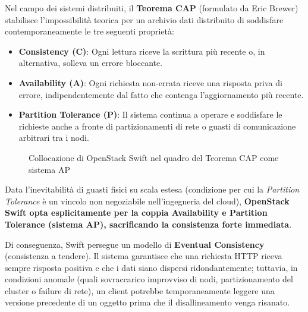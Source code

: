 \documentclass[11pt, a4paper]{article}
\begin{document}
Nel campo dei sistemi distribuiti, il \textbf{Teorema CAP} (formulato da Eric Brewer) stabilisce l'impossibilità teorica per un archivio dati distribuito di soddisfare contemporaneamente le tre seguenti proprietà:
\begin{itemize}
    \item \textbf{Consistency (C)}: Ogni lettura riceve la scrittura più recente o, in alternativa, solleva un errore bloccante.
    \item \textbf{Availability (A)}: Ogni richiesta non-errata riceve una risposta priva di errore, indipendentemente dal fatto che contenga l'aggiornamento più recente.
    \item \textbf{Partition Tolerance (P)}: Il sistema continua a operare e soddisfare le richieste anche a fronte di partizionamenti di rete o guasti di comunicazione arbitrari tra i nodi.
\end{itemize}

\begin{figure}[H]
\centering
{}
\caption{Collocazione di OpenStack Swift nel quadro del Teorema CAP come sistema AP}
\label{fig:cap_swift}
\end{figure}

Data l'inevitabilità di guasti fisici su scala estesa (condizione per cui la \emph{Partition Tolerance} è un vincolo non negoziabile nell'ingegneria del cloud), \textbf{OpenStack Swift opta esplicitamente per la coppia Availability e Partition Tolerance (sistema AP), sacrificando la consistenza forte immediata}.

Di conseguenza, Swift persegue un modello di \textbf{Eventual Consistency} (consistenza a tendere). Il sistema garantisce che una richiesta HTTP riceva sempre risposta positiva e che i dati siano dispersi ridondantemente; tuttavia, in condizioni anomale (quali sovraccarico improvviso di nodi, partizionamento del cluster o failure di rete), un client potrebbe temporaneamente leggere una versione precedente di un oggetto prima che il disallineamento venga risanato.
\end{document}
